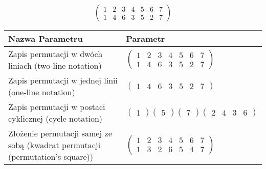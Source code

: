 \documentclass[12pt]{article}
\begin{document}
\subsection{}
\begin{center}
\[
\begin{pmatrix}
	1 & 2 & 3 & 4 & 5 & 6 & 7 \\ 
	1 & 4 & 6 & 3 & 5 & 2 & 7 
\end{pmatrix}
\]

\begin{tabular}{|m{0.6\linewidth}|m{0.4\linewidth}|}
	\hline
	Nazwa Parametru & Parametr \\
	\hline
	Zapis permutacji w dwóch liniach (two-line notation) & $\begin{pmatrix} 1 & 2 & 3 & 4 & 5 & 6 & 7 \\ 
1 & 4 & 6 & 3 & 5 & 2 & 7 \end{pmatrix}$ \\ 
	\hline
	Zapis permutacji w jednej linii (one-line notation) & $\begin{pmatrix} 1 & 4 & 6 & 3 & 5 & 2 & 7 \end{pmatrix}$ \\ 
	\hline
	Zapis permutacji w postaci cyklicznej (cycle notation) & $\begin{pmatrix} 1 \end{pmatrix} \begin{pmatrix} 5 \end{pmatrix} \begin{pmatrix} 7 \end{pmatrix} \begin{pmatrix} 2 & 4 & 3 & 6 \end{pmatrix} $ \\ 
	\hline
	Złożenie permutacji samej ze sobą (kwadrat permutacji (permutation's square)) & $\begin{pmatrix} 1 & 2 & 3 & 4 & 5 & 6 & 7 \\ 
1 & 3 & 2 & 6 & 5 & 4 & 7 \end{pmatrix}$ \\ 
	\hline
\end{tabular}
\end{center}
\end{document}
